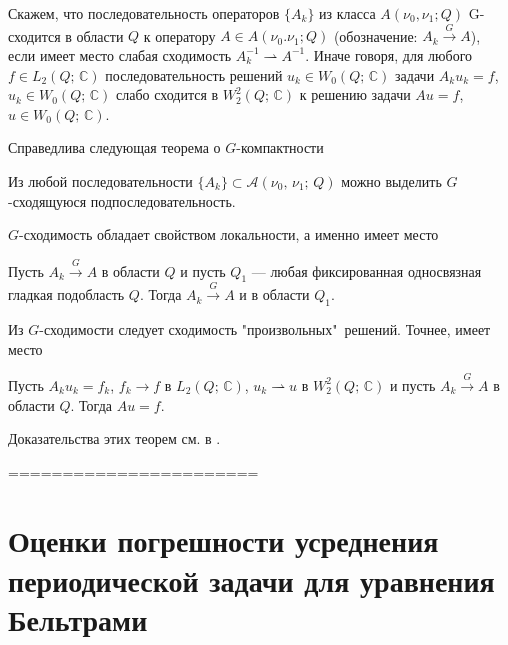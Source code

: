 
\begin{definition}
Скажем, что последовательность  операторов $\{A_k\}$ из класса
$A(\nu_0,\nu_1; Q)$ G-сходится в области $Q$ к оператору $A \in A(\nu_0.\nu_1; Q)$ (обозначение:
$A_k\overset{G}\longrightarrow A$), если имеет место слабая сходимость $ A_k^{-1}\rightharpoonup A^{-1}$. Иначе говоря, для любого $f\in L_2(Q;\,\mathbb{C})$ последовательность решений $u_k\in W_0(Q;\,\mathbb{C})$ задачи $A_ku_k=f$, $u_k\in W_0(Q;\,\mathbb{C})$ слабо сходится в $W_2^2(Q;\,\mathbb{C})$ к решению задачи $Au=f$, $u\in W_0(Q;\,\mathbb{C})$.
\end{definition}


Справедлива следующая теорема о $G$-компактности
\begin{theorem} \label{teor2}
    Из любой последовательности $\{A_k\}\subset \mathcal{A}(\nu_0,\,\nu_1;\,Q)$
    можно выделить $G$-сходящуюся подпоследовательность.
\end{theorem}
$G$-сходимость обладает свойством локальности, а именно имеет место
\begin{theorem} \label{teor3}
     Пусть $A_k\overset{G}{\to}A$  в области $Q$ и пусть $Q_1$ --- любая
     фиксированная односвязная гладкая подобласть $Q$.
     Тогда $A_k\overset{G}\longrightarrow A$ и в области $Q_1$.
\end{theorem}

Из $G$-сходимости следует сходимость "произвольных"\     решений. Точнее, имеет место
\begin{theorem}\label{teor4}
 Пусть $A_ku_k=f_k$, $f_k\to f$ в $L_2(Q;\,\mathbb{C})$, $u_k\rightharpoonup u $
 в $W_2^2(Q;\,\mathbb{C})$ и пусть $A_k\overset{G}\longrightarrow A$ в области $Q$.
 Тогда $Au=f$.
\end{theorem}

Доказательства этих теорем см. в \cite{smm_DZh}.









=======================




\chapter{Оценки погрешности усреднения периодической задачи для уравнения Бельтрами}


